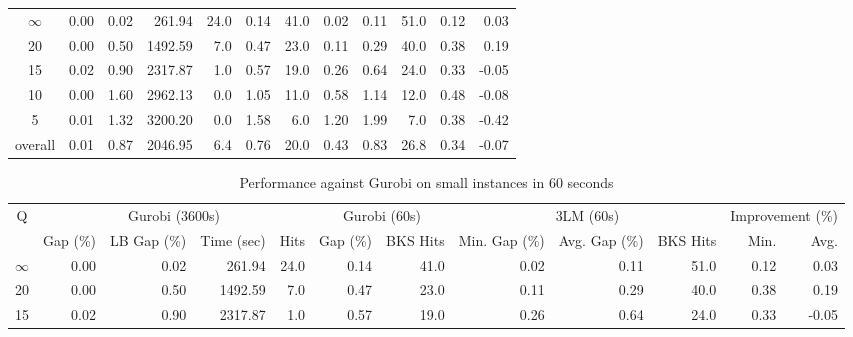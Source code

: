 \begin{table}[H]
\begin{tabular}{c rrrr rr rrr rr}
\cmidrule(lr){1-1} \cmidrule(lr){2-5} \cmidrule(lr){2-5} \cmidrule(lr){6-7} \cmidrule(lr){8-10} \cmidrule(lr){11-12}
$\infty$ &           0.00 &        0.02 &     261.94 & 24.0 &         0.14 & 41.0 &          0.02 &          0.11 & 51.0 &             0.12 &  0.03 \\
      20 &           0.00 &        0.50 &    1492.59 &  7.0 &         0.47 & 23.0 &          0.11 &          0.29 & 40.0 &             0.38 &  0.19 \\
      15 &           0.02 &        0.90 &    2317.87 &  1.0 &         0.57 & 19.0 &          0.26 &          0.64 & 24.0 &             0.33 & -0.05 \\
      10 &           0.00 &        1.60 &    2962.13 &  0.0 &         1.05 & 11.0 &          0.58 &          1.14 & 12.0 &             0.48 & -0.08 \\
       5 &           0.01 &        1.32 &    3200.20 &  0.0 &         1.58 &  6.0 &          1.20 &          1.99 &  7.0 &             0.38 & -0.42 \\
\midrule
 overall &           0.01 &        0.87 &    2046.95 &  6.4 &         0.76 & 20.0 &          0.43 &          0.83 & 26.8 &             0.34 & -0.07 \\
\bottomrule
\end{tabular}
\end{table}\begin{table}[H]
\centering
\caption{Performance against Gurobi on small instances in 60 seconds}
\label{tab:3lm_resuts100T60}
\begin{tabular}{c rrrr rr rrr rr}
\toprule
       Q & \multicolumn{4}{c}{Gurobi (3600s)} & \multicolumn{2}{c}{Gurobi (60s)} & \multicolumn{3}{c}{3LM (60s)} & \multicolumn{2}{c}{Improvement (\%)} \\
         &       Gap (\%) & LB Gap (\%) & Time (sec) & Hits &     Gap (\%) & BKS Hits & Min. Gap (\%) & Avg. Gap (\%) & BKS Hits &             Min. &  Avg. \\
\cmidrule(lr){1-1} \cmidrule(lr){2-5} \cmidrule(lr){2-5} \cmidrule(lr){6-7} \cmidrule(lr){8-10} \cmidrule(lr){11-12}
$\infty$ &           0.00 &        0.02 &     261.94 & 24.0 &         0.14 &     41.0 &          0.02 &          0.11 &     51.0 &             0.12 &  0.03 \\
      20 &           0.00 &        0.50 &    1492.59 &  7.0 &         0.47 &     23.0 &          0.11 &          0.29 &     40.0 &             0.38 &  0.19 \\
      15 &           0.02 &        0.90 &    2317.87 &  1.0 &         0.57 &     19.0 &          0.26 &          0.64 &     24.0 &             0.33 & -0.05 \\

\end{tabular}
\end{table}
